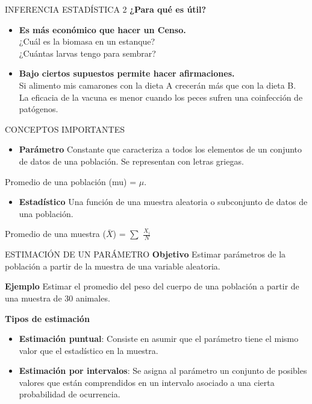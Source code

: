 \documentclass[
  ignorenonframetext,
]{beamer}
\providecommand{\tightlist}{%
  \setlength{\itemsep}{0pt}\setlength{\parskip}{0pt}}
\begin{document}
\begin{frame}{INFERENCIA ESTADÍSTICA 2}
\protect\hypertarget{inferencia-estaduxedstica-2}{}
\textbf{¿Para qué es útil?}

\begin{itemize}
\item
  \textbf{Es más económico que hacer un Censo.}\\
  ¿Cuál es la biomasa en un estanque?\\
  ¿Cuántas larvas tengo para sembrar?
\item
  \textbf{Bajo ciertos supuestos permite hacer afirmaciones.}\\
  Si alimento mis camarones con la dieta A crecerán más que con la dieta
  B.\\
  La eficacia de la vacuna es menor cuando los peces sufren una
  coinfección de patógenos.
\end{itemize}
\end{frame}

\begin{frame}{CONCEPTOS IMPORTANTES}
\protect\hypertarget{conceptos-importantes}{}
\begin{itemize}
\tightlist
\item
  \textbf{Parámetro} Constante que caracteriza a todos los elementos de
  un conjunto de datos de una población. Se representan con letras
  griegas.
\end{itemize}

Promedio de una población (mu) = \(\mu\).

\begin{itemize}
\tightlist
\item
  \textbf{Estadístico} Una función de una muestra aleatoria o
  subconjunto de datos de una población.
\end{itemize}

Promedio de una muestra (\(\bar{X}\)) = \(\sum\) \(\frac{X_i}{N}\)
\end{frame}

\begin{frame}{ESTIMACIÓN DE UN PARÁMETRO}
\protect\hypertarget{estimaciuxf3n-de-un-paruxe1metro}{}
\textbf{Objetivo} Estimar parámetros de la población a partir de la
muestra de una variable aleatoria.

\textbf{Ejemplo} Estimar el promedio del peso del cuerpo de una
población a partir de una muestra de 30 animales.

\textbf{Tipos de estimación}

\begin{itemize}
\item
  \textbf{Estimación puntual}: Consiste en asumir que el parámetro tiene
  el mismo valor que el estadístico en la muestra.
\item
  \textbf{Estimación por intervalos}: Se asigna al parámetro un conjunto
  de posibles valores que están comprendidos en un intervalo asociado a
  una cierta probabilidad de ocurrencia.
\end{itemize}
\end{frame}
\end{document}
